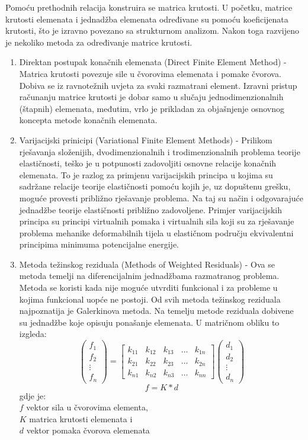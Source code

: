 \documentclass[a4paper,twoside,12pt]{memoir} %
\begin{document}
Pomoću prethodnih relacija konstruira se matrica krutosti. U početku, matrice krutosti elemenata i jednadžba elemenata određivane su pomoću koeficijenata krutosti, što je izravno povezano sa strukturnom analizom. Nakon toga razvijeno je nekoliko metoda za određivanje matrice krutosti.
\begin{enumerate}
    \item Direktan postupak konačnih elemenata (Direct Finite Element Method) -
    Matrica krutosti povezuje sile u čvorovima elemenata i pomake čvorova. Dobiva se iz ravnotežnih uvjeta za svaki razmatrani element. Izravni pristup računanju matrice krutosti je dobar samo u slučaju jednodimenzionalnih (štapnih) elemenata, međutim, vrlo je prikladan za objašnjenje osnovnog koncepta metode konačnih elemenata.
    
    \item Varijacijski prinicipi (Variational Finite Element Methods) -
    Prilikom rješavanja složenijih, dvodimenzionalnih i trodimenzionalnih problema teorije elastičnosti, teško je u potpunosti zadovoljiti osnovne relacije konačnih elemenata. To je razlog za primjenu varijacijskih principa u kojima su sadržane relacije teorije elastičnosti pomoću kojih je, uz dopuštenu grešku, moguće provesti približno rješavanje problema. Na taj su način i odgovarajuće jednadžbe teorije elastičnosti približno zadovoljene. Primjer varijacijskih principa su principi virtualnih pomaka i virtualnih sila koji su za rješavanje problema mehanike deformabilnih tijela u elastičnom području ekvivalentni principima minimuma potencijalne energije.
    
    \item Metoda težinskog reziduala (Methods of Weighted Residuals) -
    Ova se metoda temelji na diferencijalnim jednadžbama razmatranog problema. Metoda se koristi kada nije moguće utvrditi funkcional i za probleme u kojima funkcional uopće ne postoji. Od svih metoda težinskog reziduala najpoznatija je Galerkinova metoda. Na temelju metode reziduala dobivene su jednadžbe koje opisuju ponašanje elemenata. U matričnom obliku to izgleda:
    $$
    \begin{pmatrix} f_1 \\ f_2 \\ \vdots \\ f_n \end{pmatrix}
    =
    \begin{bmatrix}
    k_{11}       & k_{12} & k_{13} & \dots & k_{1n} \\
    k_{21}       & k_{22} & k_{23} & \dots & k_{2n} \\
    k_{n1}       & k_{n2} & k_{n3} & \dots & k_{nn}
    \end{bmatrix} 
    \begin{pmatrix} d_1 \\ d_2 \\ \vdots \\ d_n \end{pmatrix}
    $$
    $$ f = K * d $$
    gdje je: \\
    $f$ vektor sila u čvorovima elementa, \\
    $K$ matrica krutosti elemenata i \\
    $d$ vektor pomaka čvorova elemenata 
\end{enumerate}
\end{document}
